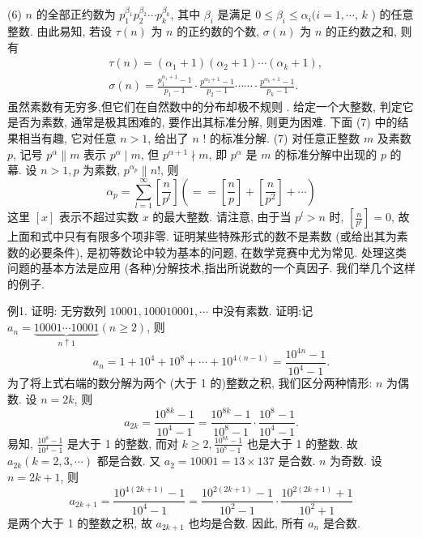 (6) $n$ 的全部正约数为 $p_1^{\beta_1} p_2^{\beta_2} \cdots p_k^{\beta_k}$, 其中 $\beta_i$ 是满足 $0 \leqslant \beta_i \leqslant \alpha_i(i=1, \cdots$, $k$ ) 的任意整数.
由此易知, 若设 $\tau(n)$ 为 $n$ 的正约数的个数, $\sigma(n)$ 为 $n$ 的正约数之和, 则有
$$
\begin{aligned}
& \tau(n)=\left(\alpha_1+1\right)\left(\alpha_2+1\right) \cdots\left(\alpha_k+1\right), \\
& \sigma(n)=\frac{p_1^{\alpha_1+1}-1}{p_1-1} \cdot \frac{p^{\alpha_2+1}-1}{p_2-1} \cdots \cdots \cdot \frac{p^{\alpha_k+1}-1}{p_k-1} .
\end{aligned}
$$
虽然素数有无穷多,但它们在自然数中的分布却极不规则 . 给定一个大整数, 判定它是否为素数, 通常是极其困难的, 要作出其标准分解, 则更为困难.
下面 (7) 中的结果相当有趣, 它对任意 $n>1$, 给出了 $n$ ! 的标准分解.
(7) 对任意正整数 $m$ 及素数 $p$, 记号 $p^\alpha \| m$ 表示 $p^\alpha \mid m$, 但 $p^{\alpha+1} \nmid m$, 即 $p^\alpha$ 是 $m$ 的标准分解中出现的 $p$ 的幕.
设 $n>1, p$ 为素数, $p^{\alpha_p} \| n !$, 则
$$
\alpha_p=\sum_{l=1}^{\infty}\left[\frac{n}{p^l}\right]\left(==\left[\frac{n}{p}\right]+\left[\frac{n}{p^2}\right]+\cdots\right)
$$
这里 $[x]$ 表示不超过实数 $x$ 的最大整数.
请注意, 由于当 $p^l>n$ 时, $\left[\frac{n}{p^l}\right]=0$, 故上面和式中只有有限多个项非零.
证明某些特殊形式的数不是素数 (或给出其为素数的必要条件), 是初等数论中较为基本的问题, 在数学竞赛中尤为常见.
处理这类问题的基本方法是应用 (各种)分解技术,指出所说数的一个真因子.
我们举几个这样的例子.



例1. 证明: 无穷数列 $10001,100010001, \cdots$ 中没有素数.
证明:记 $a_n=\underbrace{10001 \cdots 10001}_{n \uparrow 1}(n \geqslant 2)$, 则
$$
a_n=1+10^4+10^8+\cdots+10^{4(n-1)}=\frac{10^{4 n}-1}{10^4-1} .
$$
为了将上式右端的数分解为两个 (大于 1 的)整数之积, 我们区分两种情形:
$n$ 为偶数.
设 $n=2 k$, 则
$$
a_{2 k}=\frac{10^{8 k}-1}{10^4-1}=\frac{10^{8 k}-1}{10^8-1} \cdot \frac{10^8-1}{10^4-1} .
$$
易知, $\frac{10^8-1}{10^4-1}$ 是大于 1 的整数, 而对 $k \geqslant 2, \frac{10^{8 k}-1}{10^8-1}$ 也是大于 1 的整数.
故 $a_{2 k}(k=2,3, \cdots)$ 都是合数.
又 $a_2=10001=13 \times 137$ 是合数.
$n$ 为奇数.
设 $n=2 k+1$, 则
$$
a_{2 k+1}=\frac{10^{4(2 k+1)}-1}{10^4-1}=\frac{10^{2(2 k+1)}-1}{10^2-1} \cdot \frac{10^{2(2 k+1)}+1}{10^2+1}
$$
是两个大于 1 的整数之积, 故 $a_{2 k+1}$ 也均是合数.
因此, 所有 $a_n$ 是合数.



